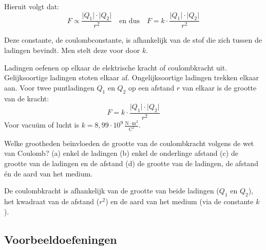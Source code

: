 \documentclass{ximera}
\begin{document}
Hieruit volgt dat:
$$F \propto \frac{\lvert Q_{1}\rvert\cdot \lvert Q_{2}\rvert}{r^{2}} \quad \text{en dus} \quad F=k \cdot \frac{\lvert Q_{1}\rvert\cdot \lvert Q_{2}\rvert}{r^{2}}$$

Deze constante, de coulombconstante, is afhankelijk van de stof die zich tussen de ladingen bevindt. Men stelt deze voor door $k$.

\begin{theorem}[title={Wet van Coulomb}]\nl
    Ladingen oefenen op elkaar de elektrische kracht of coulombkracht uit. Gelijksoortige ladingen stoten elkaar af. Ongelijksoortige ladingen trekken elkaar aan. Voor twee puntladingen $Q_{1}$ en $Q_{2}$ op een afstand $r$ van elkaar is de grootte van de kracht:
    \begin{equation}\label{eq:coulombkracht}
    F = k \cdot \frac{\lvert Q_{1}\rvert\cdot \lvert Q_{2}\rvert}{r^{2}}
    \end{equation}
    Voor vacuüm of lucht is $k = 8{,}99 \cdot 10^9 \, \mathrm{\frac{N\cdot m^2}{C^2}}$.
\end{theorem}

\vspace{2mm}
\begin{question}\label{q:formule coulomb}
    Welke grootheden beïnvloeden de grootte van de coulombkracht volgens de wet van Coulomb? (a) enkel de ladingen (b) enkel de onderlinge afstand (c) de grootte van de ladingen en de afstand (d) de grootte van de ladingen, de afstand én de aard van het medium.
    \begin{onlineOnly}
        \begin{multipleChoice}
        \end{multipleChoice}
        \begin{solution}
            De coulombkracht is afhankelijk van de grootte van beide ladingen ($Q_1$ en $Q_2$), het kwadraat van de afstand ($r^2$) en de aard van het medium (via de constante $k$).
        \end{solution}
    \end{onlineOnly}
\end{question}


\subsection{Voorbeeldoefeningen}
\end{document}
